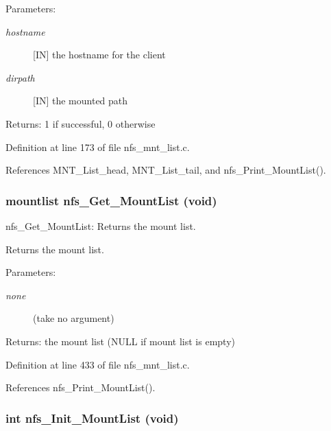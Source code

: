 \begin{Desc}
\item[Parameters:]
\begin{description}
\item[{\em hostname}][IN] the hostname for the client \item[{\em dirpath}][IN] the mounted path\end{description}
\end{Desc}
\begin{Desc}
\item[Returns:]1 if successful, 0 otherwise \end{Desc}


Definition at line 173 of file nfs\_\-mnt\_\-list.c.

References MNT\_\-List\_\-head, MNT\_\-List\_\-tail, and nfs\_\-Print\_\-Mount\-List().
\subsubsection{\setlength{\rightskip}{0pt plus 5cm}mountlist nfs\_\-Get\_\-Mount\-List (void)}\label{nfs__mnt__list_8c_a6}


nfs\_\-Get\_\-Mount\-List: Returns the mount list.

Returns the mount list.

\begin{Desc}
\item[Parameters:]
\begin{description}
\item[{\em none}](take no argument)\end{description}
\end{Desc}
\begin{Desc}
\item[Returns:]the mount list (NULL if mount list is empty) \end{Desc}


Definition at line 433 of file nfs\_\-mnt\_\-list.c.

References nfs\_\-Print\_\-Mount\-List().
\subsubsection{\setlength{\rightskip}{0pt plus 5cm}int nfs\_\-Init\_\-Mount\-List (void)}\label{nfs__mnt__list_8c_a5}


